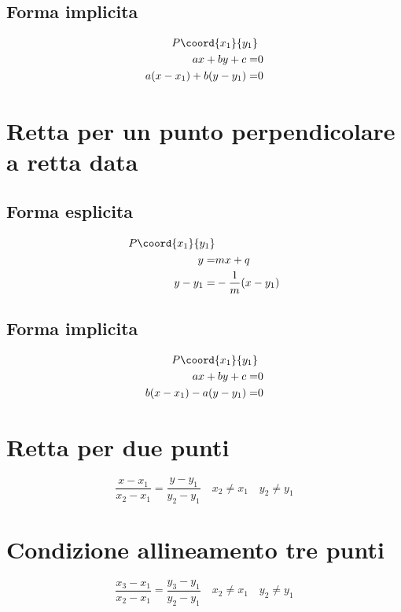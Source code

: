 \subsection{Forma implicita}
\begin{align*}
P\coord{x_1}{y_1}&\nonumber\\
ax+by+c=&0\nonumber\\
a(x-x_1)+b(y-y_1)=&0
\end{align*}
\section{Retta per un punto perpendicolare a retta data}
\subsection{Forma esplicita}
\begin{align*}
P\coord{x_1}{y_1}&\nonumber\\
y=&mx+q\nonumber\\
y-y_1=&-\dfrac{1}{m}(x-y_1)
\end{align*}
\subsection{Forma implicita}
\begin{align*}
P\coord{x_1}{y_1}&\nonumber\\
ax+by+c=&0\nonumber\\
b(x-x_1)-a(y-y_1)=&0
\end{align*}
\section{Retta per due punti}
\begin{equation*}
\dfrac{x-x_1}{x_2-x_1}=\dfrac{y-y_1}{y_2-y_1}\quad x_2\neq x_1\quad y_2\neq y_1
\end{equation*}
\section{Condizione allineamento tre  punti}
\begin{equation*}
\dfrac{x_3-x_1}{x_2-x_1}=\dfrac{y_3-y_1}{y_2-y_1}\quad x_2\neq x_1\quad y_2\neq y_1
\end{equation*}
